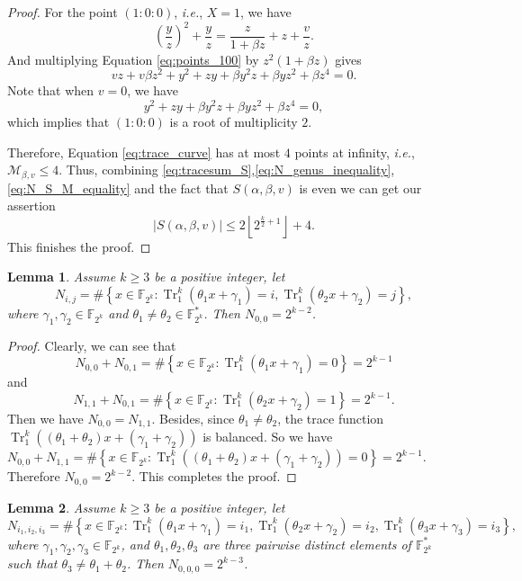 \documentclass{article}
\newcommand{\F}{\mathbb{F}}
\newcommand{\0}{\textbf{0}}
\newcommand{\1}{\textbf{1}}
\newcommand{\TRACE}{\operatorname{Tr}_1^k}
\theoremstyle{plain}
\newtheorem{lemma}{Lemma}
\begin{document}
\begin{proof}
        For the point $(1 : 0 : 0)$, \emph{i.e.}, $X = 1$, we have
        \begin{equation}\label{eq:points_100}
            \left( \frac{y}{z} \right)^2+\frac{y}{z}=\frac{z}{1+\beta z}+z+\frac{v}{z}.
        \end{equation}
        And multiplying Equation \eqref{eq:points_100} by $z^2(1+\beta z)$ gives
        \[vz+v\beta z^2+y^2+zy+\beta y^2z+\beta yz^2+\beta z^4=0.\]
        Note that when $v=0$, we have
        \[y^2+zy+\beta y^2z+\beta yz^2+\beta z^4=0,\]
        which implies that $(1:0:0)$ is a root of multiplicity $2$.

        Therefore, Equation \eqref{eq:trace_curve} has at most $4$ points at infinity, \emph{i.e.},
        $\mathcal{M}_{\beta,v}\le 4$.
        Thus, combining \eqref{eq:tracesum_S},\eqref{eq:N_genus_inequality},\eqref{eq:N_S_M_equality} and the fact that
        $S(\alpha,\beta,v)$ is even we can get our assertion
        \[\left\lvert S(\alpha,\beta,v)\right\rvert \le 2\left\lfloor 2^{\frac{k}{2}+1}\right\rfloor+4.\]
        This finishes the proof.
    \end{proof}

    \begin{lemma}\label{lemma:N_ij_trace}
        Assume  $k\ge 3$ be a positive integer, let
        \[ N_{i,j} =\#\left\{x\in\F_{2^k} : \TRACE\left(\theta_1x+\gamma_1\right)=i,\TRACE\left(\theta_2x+\gamma_2\right)=j\right\}, \]
        where  $\gamma_1,\gamma_2\in\F_{2^k}$ and $\theta_1\ne\theta_2\in\F_{2^k}^*$. Then $N_{0,0} =2^{k-2}$.
    \end{lemma}

   \begin{proof}
        Clearly, we can see that
        \[N_{0,0}+N_{0,1}=\#\left\{x\in\F_{2^k} : \TRACE\left(\theta_1x+\gamma_1\right)=0\right\}=2^{k-1}\]
        and
        \[N_{1,1}+N_{0,1}=\#\left\{x\in\F_{2^k} : \TRACE\left(\theta_2x+\gamma_2\right)=1\right\}=2^{k-1}.\]
        Then we have $N_{0,0} = N_{1,1}$.
        Besides, since $\theta_1\ne\theta_2$, the trace function $\TRACE\left((\theta_1+\theta_2)x+(\gamma_1+\gamma_2)\right)$ is balanced.
        So we have $N_{0,0}+N_{1,1} = \#\left\{x\in\F_{2^k} : \TRACE\left((\theta_1+\theta_2)x+(\gamma_1+\gamma_2)\right)=0\right\}=2^{k-1}$.
        Therefore $N_{0,0}=2^{k-2}$. This completes the proof.
   \end{proof}

    \begin{lemma}\label{lemma:N_ijk_trace}
        Assume $k\ge 3$ be a positive integer, let
        \[ N_{i_1,i_2,i_3}=\#\left\{x\in\F_{2^k} :  \TRACE\left(\theta_1x+\gamma_1\right)=i_1,\TRACE\left(\theta_2x+\gamma_2\right)=i_2,\TRACE\left(\theta_3x+\gamma_3\right)=i_3 \right\},\]
        where  $\gamma_1,\gamma_2,\gamma_3\in\F_{2^k}$, and $\theta_1,\theta_2,\theta_3$ are three pairwise distinct elements of $\F_{2^k}^*$ such that $\theta_3\ne\theta_1+\theta_2$. Then $N_{0,0,0}= 2^{k-3}$.
    \end{lemma}
\end{document}

